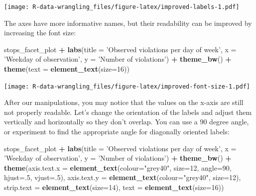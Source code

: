 \documentclass[]{book}
\newenvironment{Shaded}{\begin{snugshade}}{\end{snugshade}}
\newcommand{\DataTypeTok}[1]{\textcolor[rgb]{0.13,0.29,0.53}{#1}}
\newcommand{\DecValTok}[1]{\textcolor[rgb]{0.00,0.00,0.81}{#1}}
\newcommand{\KeywordTok}[1]{\textcolor[rgb]{0.13,0.29,0.53}{\textbf{#1}}}
\newcommand{\NormalTok}[1]{#1}
\newcommand{\OperatorTok}[1]{\textcolor[rgb]{0.81,0.36,0.00}{\textbf{#1}}}
\newcommand{\StringTok}[1]{\textcolor[rgb]{0.31,0.60,0.02}{#1}}
\begin{document}
\texttt{[image: R-data-wrangling\_files/figure-latex/improved-labels-1.pdf]}

The axes have more informative names, but their readability can be improved by
increasing the font size:

\begin{Shaded}
\begin{Highlighting}[]
\NormalTok{stops_facet_plot }\OperatorTok{+}
\StringTok{  }\KeywordTok{labs}\NormalTok{(}\DataTypeTok{title =} \StringTok{'Observed violations per day of week'}\NormalTok{,}
         \DataTypeTok{x =} \StringTok{'Weekday of observation'}\NormalTok{,}
         \DataTypeTok{y =} \StringTok{'Number of violations'}\NormalTok{) }\OperatorTok{+}
\StringTok{  }\KeywordTok{theme_bw}\NormalTok{() }\OperatorTok{+}\StringTok{ }
\StringTok{  }\KeywordTok{theme}\NormalTok{(}\DataTypeTok{text =} \KeywordTok{element_text}\NormalTok{(}\DataTypeTok{size=}\DecValTok{16}\NormalTok{))}
\end{Highlighting}
\end{Shaded}

\texttt{[image: R-data-wrangling\_files/figure-latex/improved-font-size-1.pdf]}

After our manipulations, you may notice that the values on the x-axis are still not properly readable. Let's change the orientation of the labels and adjust them vertically and horizontally so they don't overlap. You can use a 90 degree angle, or experiment to find the appropriate angle for diagonally oriented labels:

\begin{Shaded}
\begin{Highlighting}[]
\NormalTok{stops_facet_plot }\OperatorTok{+}
\StringTok{  }\KeywordTok{labs}\NormalTok{(}\DataTypeTok{title =} \StringTok{'Observed violations per day of week'}\NormalTok{,}
         \DataTypeTok{x =} \StringTok{'Weekday of observation'}\NormalTok{,}
         \DataTypeTok{y =} \StringTok{'Number of violations'}\NormalTok{) }\OperatorTok{+}
\StringTok{  }\KeywordTok{theme_bw}\NormalTok{() }\OperatorTok{+}\StringTok{ }
\StringTok{  }\KeywordTok{theme}\NormalTok{(}\DataTypeTok{axis.text.x =} \KeywordTok{element_text}\NormalTok{(}\DataTypeTok{colour=}\StringTok{"grey40"}\NormalTok{, }\DataTypeTok{size=}\DecValTok{12}\NormalTok{, }\DataTypeTok{angle=}\DecValTok{90}\NormalTok{, }\DataTypeTok{hjust=}\NormalTok{.}\DecValTok{5}\NormalTok{, }\DataTypeTok{vjust=}\NormalTok{.}\DecValTok{5}\NormalTok{),}
        \DataTypeTok{axis.text.y =} \KeywordTok{element_text}\NormalTok{(}\DataTypeTok{colour=}\StringTok{"grey40"}\NormalTok{, }\DataTypeTok{size=}\DecValTok{12}\NormalTok{),}
        \DataTypeTok{strip.text =} \KeywordTok{element_text}\NormalTok{(}\DataTypeTok{size=}\DecValTok{14}\NormalTok{),}
        \DataTypeTok{text =} \KeywordTok{element_text}\NormalTok{(}\DataTypeTok{size=}\DecValTok{16}\NormalTok{))}
\end{Highlighting}
\end{Shaded}
\end{document}
